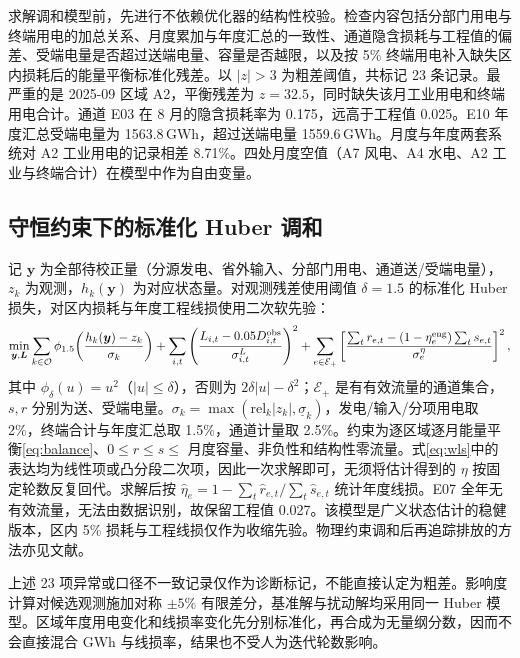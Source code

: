 \documentclass[UTF8,a4paper,zihao=-4,fontset=fandol]{ctexart}
\begin{document}
求解调和模型前，先进行不依赖优化器的结构性校验。检查内容包括分部门用电与终端用电的加总关系、月度累加与年度汇总的一致性、通道隐含损耗与工程值的偏差、受端电量是否超过送端电量、容量是否越限，以及按 5\% 终端用电补入缺失区内损耗后的能量平衡标准化残差。以 $|z|>3$ 为粗差阈值，共标记 23 条记录。最严重的是 2025-09 区域 A2，平衡残差为 $z=32.5$，同时缺失该月工业用电和终端用电合计。通道 E03 在 8 月的隐含损耗率为 0.175，远高于工程值 0.025。E10 年度汇总受端电量为 1563.8\,GWh，超过送端电量 1559.6\,GWh。月度与年度两套系统对 A2 工业用电的记录相差 8.71\%。四处月度空值（A7 风电、A4 水电、A2 工业与终端合计）在模型中作为自由变量。

\subsection{守恒约束下的标准化 Huber 调和}

记 $\boldsymbol y$ 为全部待校正量（分源发电、省外输入、分部门用电、通道送/受端电量），$z_k$ 为观测，$h_k(\boldsymbol y)$ 为对应状态量。对观测残差使用阈值 $\delta=1.5$ 的标准化 Huber 损失，对区内损耗与年度工程线损使用二次软先验\cite{Crowe1996data,Narasimhan1999data}：
\begin{equation}
\min_{\boldsymbol y,\boldsymbol L}
\sum_{k\in\mathcal O}\phi_{1.5}\!\left(
\frac{h_k(\boldsymbol y)-z_k}{\sigma_k}\right)
+\sum_{i,t}\left(\frac{L_{i,t}-0.05D^{\rm obs}_{i,t}}
{\sigma^L_{i,t}}\right)^2
+\sum_{e\in\mathcal E_+}\left[
\frac{\sum_t r_{e,t}-(1-\eta_e^{\rm eng})\sum_t s_{e,t}}
{\sigma^{\eta}_e}\right]^2,
\label{eq:wls}
\end{equation}
其中 $\phi_\delta(u)=u^2$（$|u|\le\delta$），否则为 $2\delta|u|-\delta^2$；$\mathcal E_+$ 是有有效流量的通道集合，$s,r$ 分别为送、受端电量。$\sigma_k=\max(\mathrm{rel}_k|z_k|,\underline\sigma_k)$，发电/输入/分项用电取 2\%，终端合计与年度汇总取 1.5\%，通道计量取 2.5\%。约束为逐区域逐月能量平衡\eqref{eq:balance}、$0\le r\le s\le$ 月度容量、非负性和结构性零流量。式\eqref{eq:wls}中的表达均为线性项或凸分段二次项，因此一次求解即可，无须将估计得到的 $\eta$ 按固定轮数反复回代。求解后按 $\hat\eta_e=1-\sum_t\hat r_{e,t}/\sum_t\hat s_{e,t}$ 统计年度线损。E07 全年无有效流量，无法由数据识别，故保留工程值 0.027。该模型是广义状态估计的稳健版本\cite{Schweppe1970power,Abur2004power,Liu2023robust}，区内 5\% 损耗与工程线损仅作为收缩先验。物理约束调和后再追踪排放的方法亦见文献\cite{deChalendar2021physics}。

上述 23 项异常或口径不一致记录仅作为诊断标记，不能直接认定为粗差。影响度计算对候选观测施加对称 $\pm5\%$ 有限差分，基准解与扰动解均采用同一 Huber 模型。区域年度用电变化和线损率变化先分别标准化，再合成为无量纲分数，因而不会直接混合 GWh 与线损率，结果也不受人为迭代轮数影响。
\end{document}
